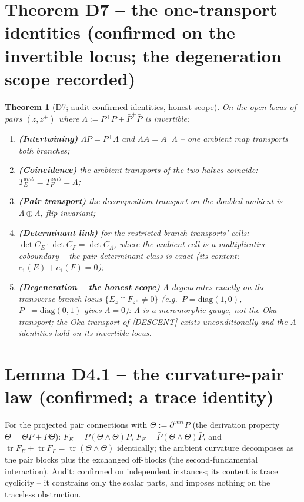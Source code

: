 \documentclass[11pt]{article}
\newtheorem{theorem}{Theorem}
\newcommand{\tr}{\operatorname{tr}}
\begin{document}
\section{Theorem D7 -- the one-transport identities (confirmed on the invertible locus; the degeneration scope recorded)}

\begin{theorem}[D7; audit-confirmed identities, honest scope]
On the open locus of pairs $(z,z^+)$ where $\Lambda:=P^+P+\bar P^+\bar P$ is invertible:
\begin{enumerate}
\item \textbf{(Intertwining)} $\Lambda P=P^+\Lambda$ and $\Lambda A=A^+\Lambda$ -- one ambient map transports both branches;
\item \textbf{(Coincidence)} the ambient transports of the two halves coincide: $T_E^{amb}=T_F^{amb}=\Lambda$;
\item \textbf{(Pair transport)} the decomposition transport on the doubled ambient is $\Lambda\oplus\Lambda$, flip-invariant;
\item \textbf{(Determinant link)} for the restricted branch transports' cells: $\det C_E\cdot\det C_F=\det C_\Lambda$, where the ambient cell is a multiplicative coboundary -- the pair determinant class is exact (its content: $c_1(E)+c_1(F)=0$);
\item \textbf{(Degeneration -- the honest scope)} $\Lambda$ degenerates exactly on the transverse-branch locus $\{E_z\cap F_{z^+}\ne0\}$ (e.g.\ $P=\mathrm{diag}(1,0)$, $P^+=\mathrm{diag}(0,1)$ gives $\Lambda=0$): $\Lambda$ is a meromorphic gauge, not the Oka transport; the Oka transport of [DESCENT] exists unconditionally and the $\Lambda$-identities hold on its invertible locus.
\end{enumerate}
\end{theorem}

\section{Lemma D4.1 -- the curvature-pair law (confirmed; a trace identity)}

For the projected pair connections with $\Theta:=\partial^{vert}P$ (the derivation property $\Theta=\Theta P+P\Theta$): $F_E=P(\Theta\wedge\Theta)P$, $F_F=\bar P(\Theta\wedge\Theta)\bar P$, and $\tr F_E+\tr F_F=\tr(\Theta\wedge\Theta)$ identically; the ambient curvature decomposes as the pair blocks plus the exchanged off-blocks (the second-fundamental interaction). Audit: confirmed on independent instances; its content is trace cyclicity -- it constrains only the scalar parts, and imposes nothing on the traceless obstruction.
\end{document}
